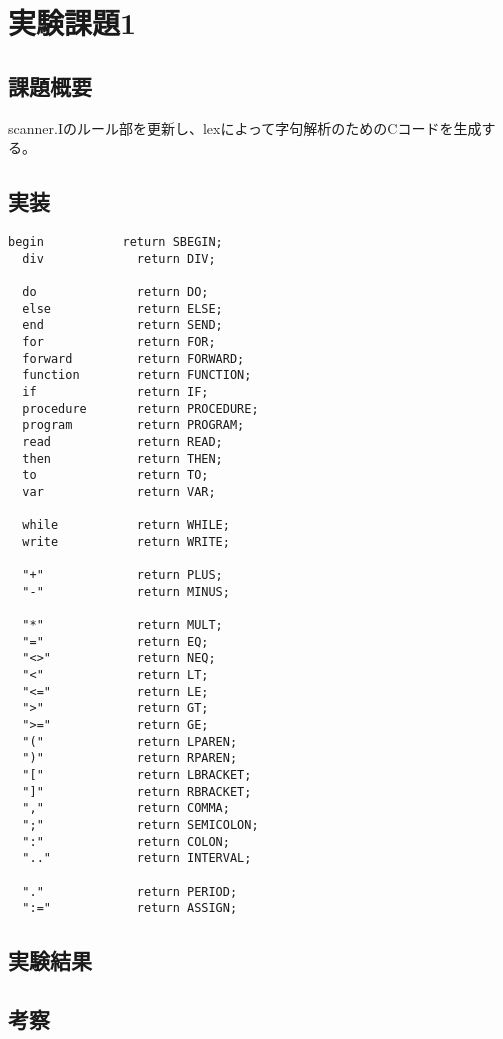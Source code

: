 \section{実験課題1}
\subsection{課題概要}
scanner.Iのルール部を更新し、lexによって字句解析のためのCコードを生成する。

\subsection{実装}
\begin{lstlisting}[caption={ルールの記述},label={ルールの記述}]
  begin           return SBEGIN;
  div             return DIV;
  
  do              return DO;
  else            return ELSE;
  end             return SEND;
  for             return FOR;
  forward         return FORWARD;
  function        return FUNCTION;
  if              return IF;
  procedure       return PROCEDURE;
  program         return PROGRAM;
  read            return READ;
  then            return THEN;
  to              return TO;
  var             return VAR;
  
  while           return WHILE;
  write           return WRITE;
  
  "+"             return PLUS;
  "-"             return MINUS;
  
  "*"             return MULT;
  "="             return EQ;
  "<>"            return NEQ;
  "<"             return LT;
  "<="            return LE;
  ">"             return GT;
  ">="            return GE;
  "("             return LPAREN;
  ")"             return RPAREN;
  "["             return LBRACKET;
  "]"             return RBRACKET;
  ","             return COMMA;
  ";"             return SEMICOLON;
  ":"             return COLON;
  ".."            return INTERVAL;
  
  "."             return PERIOD;
  ":="            return ASSIGN;
\end{lstlisting}


\subsection{実験結果}

\subsection{考察}
